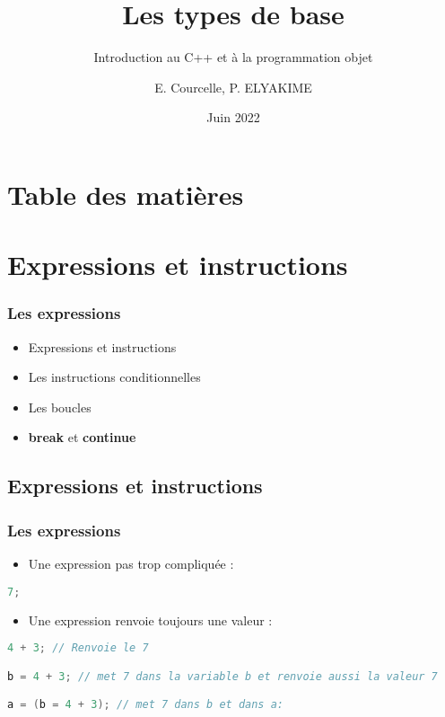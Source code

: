 \documentclass{beamer}
\title{Les types de base}
\subtitle{Introduction au C++ et à la programmation objet}
\author{E. Courcelle, P. ELYAKIME}\institute{CALMIP URA 3667, IMFT UMR 5502}
\date{Juin 2022}
\begin{document}
\begin{frame}
\titlepage
\end{frame}

\section*{Table des matières}
\begin{frame}
\tableofcontents
\end{frame}


\section{Expressions et instructions}

\begin{frame}[fragile=singleslide,shrink=20]
\frametitle {Les expressions}
\begin{itemize}
\item{Expressions et instructions}
\item{Les instructions conditionnelles}
\item{Les boucles}
\item{\textbf{break} et \textbf{continue}}
\end{itemize}

\end{frame}

\subsection{Expressions et instructions}

\begin{frame}[fragile=singleslide,shrink=20]
\frametitle {Les expressions}
\begin{itemize}
\item{Une expression pas trop compliquée :}
\end{itemize}

\begin{lstlisting}[language=c++]
7;
\end{lstlisting}

\begin{itemize}
\item{Une expression renvoie toujours une valeur : }
\end{itemize}


\begin{lstlisting}[language=c++]
4 + 3; // Renvoie le 7

b = 4 + 3; // met 7 dans la variable b et renvoie aussi la valeur 7

a = (b = 4 + 3); // met 7 dans b et dans a:
\end{lstlisting}

\end{frame}
\end{document}
